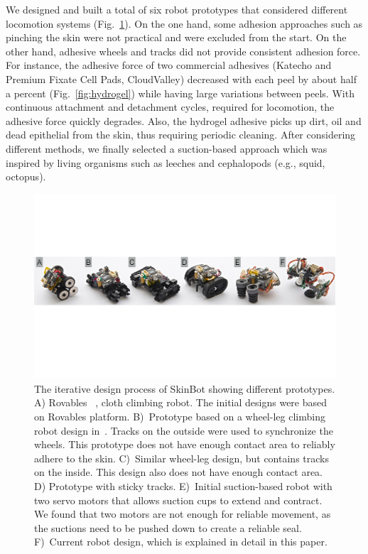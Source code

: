 We designed and built a total of six robot prototypes that considered different locomotion systems (Fig.~\ref{fig:prototypes}). On the one hand, some adhesion approaches such as pinching the skin were not practical and were excluded from the start. On the other hand, adhesive wheels and tracks did not provide consistent adhesion force. For instance, the adhesive force of two commercial adhesives (Katecho and Premium Fixate Cell Pads, CloudValley) decreased with each peel by about half a percent (Fig.~\ref{fig:hydrogel}) while having large variations between peels. With continuous attachment and detachment cycles, required for locomotion, the adhesive force quickly degrades. Also, the hydrogel adhesive picks up dirt, oil and dead epithelial from the skin, thus requiring periodic cleaning. After considering different methods, we finally selected a suction-based approach which was inspired by living organisms such as leeches and cephalopods (e.g., squid, octopus). 

\begin{figure}[!t]
\centering
\includegraphics[width=15.8cm]{pictures/chapter3/prototypes.pdf}
\caption{The iterative design process of SkinBot showing different prototypes. A) Rovables ~\cite{dementyev2016rovables}, cloth climbing robot. The initial designs were based on Rovables platform. B)~Prototype based on a wheel-leg climbing robot design in~\cite{daltorio2005small}. Tracks on the outside were used to synchronize the wheels. This prototype does not have enough contact area to reliably adhere to the skin. C)~Similar wheel-leg design, but contains tracks on the inside. This design also does not have enough contact area. D) Prototype with sticky tracks. E)~Initial suction-based robot with two servo motors that allows suction cups to extend and contract. We found that two motors are not enough for reliable movement, as the suctions need to be pushed down to create a reliable seal. F)~Current robot design, which is explained in detail in this paper.}
\label{fig:prototypes}
\end{figure}


